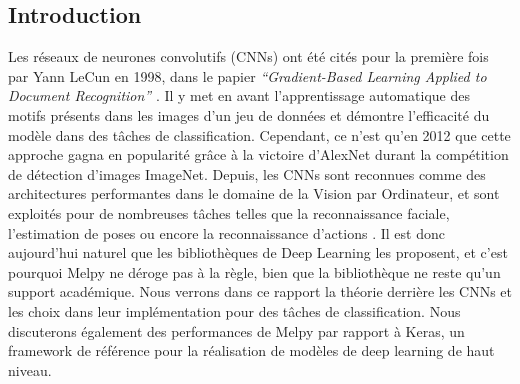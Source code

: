 \begin{multicols}{2}
\tableofcontents
\section{Introduction}
Les réseaux de neurones convolutifs (CNNs) ont été cités pour 
la première fois par Yann LeCun en 1998, dans le papier 
\textit{“Gradient-Based Learning Applied to Document Recognition”} \cite{YannLeCunCNNs}.
Il y met en avant l’apprentissage automatique des motifs présents dans les 
images d’un jeu de données et démontre l’efficacité du modèle dans des tâches
de classification. Cependant, ce n’est qu’en 2012 que cette approche 
gagna en popularité grâce à la victoire d’AlexNet\cite{AlexNet} durant la 
compétition de détection d’images ImageNet. Depuis, les CNNs sont reconnues 
comme des architectures performantes dans le domaine de la Vision par Ordinateur, 
et sont exploités pour de nombreuses tâches telles que la reconnaissance 
faciale, l’estimation de poses ou encore la reconnaissance d’actions 
\cite{ApplicationsOfCNNs}. Il est donc aujourd’hui naturel que les bibliothèques 
de Deep Learning les proposent, et c’est pourquoi Melpy ne déroge pas à la 
règle, bien que la bibliothèque ne reste qu'un support académique. Nous verrons dans ce rapport la théorie derrière les CNNs et les choix 
dans leur implémentation pour des tâches de classification. Nous discuterons 
également des performances de Melpy par rapport à Keras, un framework de 
référence pour la réalisation de modèles de deep learning de haut niveau.
\end{multicols}